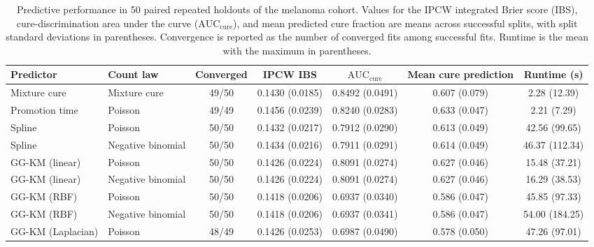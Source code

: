 \begin{table}[tbp]
\caption{Predictive performance in 50 paired repeated holdouts of the melanoma cohort.
Values for the IPCW integrated Brier score (IBS), cure-discrimination area under the curve
($\mathrm{AUC}_{\mathrm{cure}}$), and mean predicted cure fraction are means across successful
splits, with split standard deviations in parentheses. Convergence is reported as the number
of converged fits among successful fits. Runtime is the mean with the maximum in parentheses.
}
\label{tab:melanoma-performance}
\centering
\begin{tabular}{llccccc}
\hline
Predictor & Count law & Converged & IPCW IBS &
$\mathrm{AUC}_{\mathrm{cure}}$ & Mean cure prediction & Runtime (s) \\
\hline

Mixture cure
& Mixture cure
& 49/50
& 0.1430 (0.0185)
& 0.8492 (0.0491)
& 0.607 (0.079)
& 2.28 (12.39) \\

Promotion time
& Poisson
& 49/49
& 0.1456 (0.0239)
& 0.8240 (0.0283)
& 0.633 (0.047)
& 2.21 (7.29) \\

\hline

Spline
& Poisson
& 50/50
& 0.1432 (0.0217)
& 0.7912 (0.0290)
& 0.613 (0.049)
& 42.56 (99.65) \\

Spline
& Negative binomial
& 50/50
& 0.1434 (0.0216)
& 0.7911 (0.0291)
& 0.614 (0.049)
& 46.37 (112.34) \\

\hline

GG-KM (linear)
& Poisson
& 50/50
& 0.1426 (0.0224)
& 0.8091 (0.0274)
& 0.627 (0.046)
& 15.48 (37.21) \\

GG-KM (linear)
& Negative binomial
& 50/50
& 0.1426 (0.0224)
& 0.8091 (0.0274)
& 0.627 (0.046)
& 16.29 (38.53) \\

GG-KM (RBF)
& Poisson
& 50/50
& 0.1418 (0.0206)
& 0.6937 (0.0340)
& 0.586 (0.047)
& 45.85 (97.33) \\

GG-KM (RBF)
& Negative binomial
& 50/50
& 0.1418 (0.0206)
& 0.6937 (0.0341)
& 0.586 (0.047)
& 54.00 (184.25) \\

GG-KM (Laplacian)
& Poisson
& 48/49
& 0.1426 (0.0253)
& 0.6987 (0.0490)
& 0.578 (0.050)
& 47.26 (97.01) \\


\end{tabular}
\end{table}
